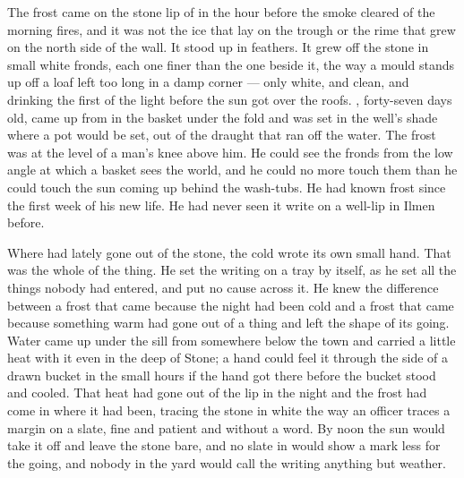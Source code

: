 
The frost came on the stone lip of  in the hour before the smoke cleared of the morning fires, and it was not the ice that lay on the trough or the rime that grew on the north side of the wall. It stood up in feathers. It grew off the stone in small white fronds, each one finer than the one beside it, the way a mould stands up off a loaf left too long in a damp corner --- only white, and clean, and drinking the first of the light before the sun got over the roofs. , forty-seven days old, came up from  in the basket under the fold and was set in the well's shade where a pot would be set, out of the draught that ran off the water. The frost was at the level of a man's knee above him. He could see the fronds from the low angle at which a basket sees the world, and he could no more touch them than he could touch the sun coming up behind the wash-tubs. He had known frost since the first week of his new life. He had never seen it write on a well-lip in Ilmen before.

Where  had lately gone out of the stone, the cold wrote its own small hand. That was the whole of the thing. He set the writing on a tray by itself, as he set all the things nobody had entered, and put no cause across it. He knew the difference between a frost that came because the night had been cold and a frost that came because something warm had gone out of a thing and left the shape of its going. Water came up under the sill from somewhere below the town and carried a little heat with it even in the deep of Stone; a hand could feel it through the side of a drawn bucket in the small hours if the hand got there before the bucket stood and cooled. That heat had gone out of the lip in the night and the frost had come in where it had been, tracing the stone in white the way an officer traces a margin on a slate, fine and patient and without a word. By noon the sun would take it off and leave the stone bare, and no slate in  would show a mark less for the going, and nobody in the yard would call the writing anything but weather.

